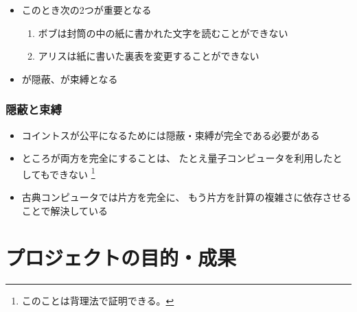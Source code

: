 \begin{frame}
\begin{exampleblock}{}
\begin{columns}
\begin{column}{0.2\textwidth}
\begin{center}
{\begin{figure}[h]
            \end{figure}
          }
        \end{center}
      \end{column}
    \end{columns}
  \end{exampleblock}

  \begin{itemize}
    \item<+-> このとき次の2つが重要となる
    \begin{enumerate}
      \item \label{enum:hiding}
      ボブは封筒の中の紙に書かれた文字を読むことができない
      \item \label{enum:binding}
      アリスは紙に書いた裏表を変更することができない
    \end{enumerate}

    \item<+-> が隠蔽、が束縛となる
  \end{itemize}
\end{frame}

\begin{frame}
  \frametitle{隠蔽と束縛}

  \pause
  \begin{itemize}
    \item<+-> コイントスが公平になるためには隠蔽・束縛が完全である必要がある

    \item<+-> ところが両方を完全にすることは、
    たとえ量子コンピュータを利用したとしてもできない%
    \footnote[frame]{このことは背理法で証明できる。}
    
    \item<+-> 古典コンピュータでは片方を完全に、
    もう片方を計算の複雑さに依存させることで解決している
  \end{itemize}

\end{frame}

\section{プロジェクトの目的・成果}

